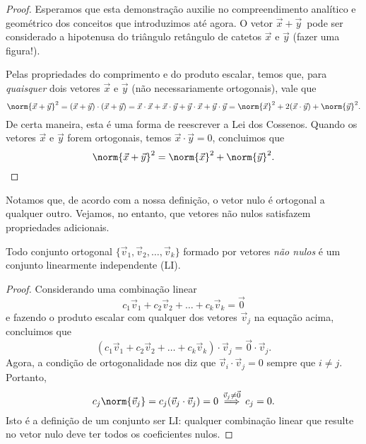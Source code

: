 \begin{proof}
	Esperamos que esta demonstração auxilie no compreendimento analítico e geométrico dos conceitos que introduzimos até agora. O vetor $\vec{x} + \vec{y} \,$ pode ser considerado a hipotenusa do triângulo retângulo de catetos $\vec{x}$ e $\vec{y}$ (fazer uma figura!).

	Pelas propriedades do comprimento e do produto escalar, temos que, para \textit{quaisquer} dois vetores $\vec{x}$ e $\vec{y}$ (não necessariamente ortogonais), vale que
	\begin{equation}
	\norm{\vec{x} + \vec{y}}^2 = (\vec{x} + \vec{y}) \cdot (\vec{x} + \vec{y}) =  \vec{x} \cdot \vec{x} + \vec{x} \cdot \vec{y} +  \vec{y} \cdot \vec{x} +  \vec{y} \cdot \vec{y} = \norm{\vec{x}}^2 + 2 (\vec{x} \cdot \vec{y}) + \norm{\vec{y}}^2.
	\end{equation} De certa maneira, esta é uma forma de reescrever a Lei dos Cossenos. Quando os vetores $\vec{x}$ e $\vec{y}$ forem ortogonais, temos $\vec{x} \cdot \vec{y} = 0$, concluimos que
	\begin{equation}
	\norm{\vec{x} + \vec{y}}^2 = \norm{\vec{x}}^2 + \norm{\vec{y}}^2. \qedhere
	\end{equation}
\end{proof}


Notamos que, de acordo com a nossa definição, o vetor nulo é ortogonal a qualquer outro. Vejamos, no entanto, que vetores não nulos satisfazem propriedades adicionais.

\begin{teo}
	Todo conjunto ortogonal $\{\vec{v}_1, \vec{v}_2, \dots, \vec{v}_k\}$ formado por vetores \textit{não nulos} é um conjunto linearmente independente (LI).
\end{teo}

\begin{proof}
	Considerando uma combinação linear
	\begin{equation}
	c_1 \vec{v}_1 + c_2 \vec{v}_2 + \dots + c_k \vec{v}_k = \vec{0}
	\end{equation} e fazendo o produto escalar com qualquer dos vetores $\vec{v}_j$ na equação acima, concluimos que
	\begin{equation}
	(c_1 \vec{v}_1 + c_2 \vec{v}_2 + \dots + c_k \vec{v}_k ) \cdot \vec{v}_j = \vec{0} \cdot \vec{v}_j.
	\end{equation} Agora, a condição de ortogonalidade nos diz que $\vec{v}_i \cdot \vec{v}_j = 0$ sempre que $i \neq j$. Portanto,
	\begin{equation}
	c_j \norm{\vec{v}_j} = c_j (\vec{v}_j \cdot \vec{v}_j) = 0 \stackrel{\vec{v}_j \neq \vec{0}}{\implies} c_j = 0.
	\end{equation} Isto é a definição de um conjunto ser LI: qualquer combinação linear que resulte no vetor nulo deve ter todos os coeficientes nulos.
\end{proof}

